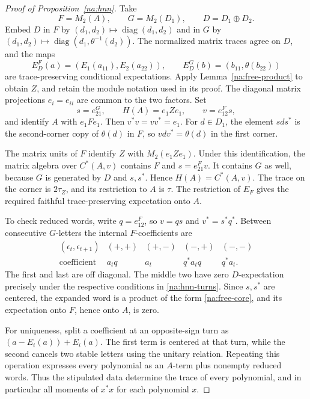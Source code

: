 \begin{proof}[Proof of Proposition~\ref{na:hnn}]
Take
\[
 F=M_2(A),\qquad G=M_2(D_1),\qquad D=D_1\oplus D_2.
\]
Embed $D$ in $F$ by $(d_1,d_2)\mapsto\operatorname{diag}(d_1,d_2)$
and in $G$ by
$(d_1,d_2)\mapsto\operatorname{diag}(d_1,\theta^{-1}(d_2))$.
The normalized matrix traces agree on $D$, and the maps
\[
 E_D^F(a)=(E_1(a_{11}),E_2(a_{22})),\qquad
 E_D^G(b)=(b_{11},\theta(b_{22}))
\]
are trace-preserving conditional expectations.  Apply
Lemma~\ref{na:free-product} to obtain $Z$, and retain the module
notation used in its proof.
The diagonal matrix projections $e_i=e_{ii}$ are common to the two
factors.  Set
\begin{equation}\label{na:hnn-corner}
 s=e_{21}^G,\qquad
 H(A)=e_1Ze_1,\qquad
 v=e_{12}^Fs,
\end{equation}
and identify $A$ with $e_1Fe_1$.  Then $v^*v=vv^*=e_1$.
For $d\in D_1$, the element $sds^*$ is the second-corner copy of
$\theta(d)$ in $F$, so $vdv^*=\theta(d)$ in the first corner.

The matrix units of $F$ identify $Z$ with $M_2(e_1Ze_1)$.  Under this
identification, the matrix algebra over $C^*(A,v)$ contains $F$ and
$s=e_{21}^Fv$.  It contains $G$ as well, because $G$ is generated by
$D$ and $s,s^*$.  Hence $H(A)=C^*(A,v)$.  The trace on the corner is
$2\tau_Z$, and its restriction to $A$ is $\tau$.  The restriction of
$E_F$ gives the required faithful trace-preserving expectation onto
$A$.

To check reduced words, write $q=e_{12}^F$, so $v=qs$ and
$v^*=s^*q^*$.  Between consecutive $G$-letters the internal
$F$-coefficients are
\[
\begin{array}{c|cccc}
 (\epsilon_t,\epsilon_{t+1}) &(+,+)&(+,-)&(-,+)&(-,-)\\ \hline
 \text{coefficient} &a_tq&a_t&q^*a_tq&q^*a_t.
\end{array}
\]
The first and last are off diagonal.  The middle two have zero
$D$-expectation precisely under the respective conditions in
\eqref{na:hnn-turns}.  Since $s,s^*$ are centered, the expanded word
is a product of the form \eqref{na:free-core}, and its expectation
onto $F$, hence onto $A$, is zero.

For uniqueness, split a coefficient at an opposite-sign turn as
$(a-E_i(a))+E_i(a)$.  The first term is centered at that turn, while
the second cancels two stable letters using the unitary relation.
Repeating this operation expresses every polynomial as an $A$-term
plus nonempty reduced words.  Thus the stipulated data determine the
trace of every polynomial, and in particular all moments of $x^*x$
for each polynomial $x$.


\end{proof}
